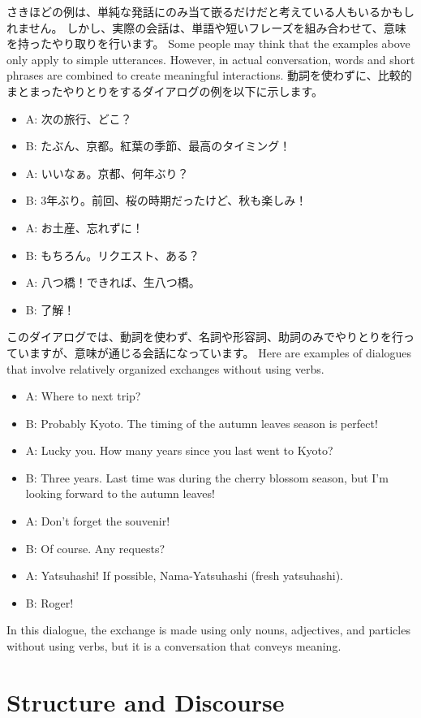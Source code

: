 \documentclass[uplatex,dvipdfmx,b5paper,english,10pt]{jsbook}
\begin{document}
\ifJapanese
  さきほどの例は、単純な発話にのみ当て嵌るだけだと考えている人もいるかもしれません。
  しかし、実際の会話は、単語や短いフレーズを組み合わせて、意味を持ったやり取りを行います。
\else
  Some people may think that the examples above only apply to simple utterances.
  However, in actual conversation, words and short phrases are combined to create meaningful interactions.
\fi
\ifJapanese
動詞を使わずに、比較的まとまったやりとりをするダイアログの例を以下に示します。
\begin{itemize}
  \item A: 次の旅行、どこ？
  \item B: たぶん、京都。紅葉の季節、最高のタイミング！
  \item A: いいなぁ。京都、何年ぶり？
  \item B: 3年ぶり。前回、桜の時期だったけど、秋も楽しみ！
  \item A: お土産、忘れずに！
  \item B: もちろん。リクエスト、ある？
  \item A: 八つ橋！できれば、生八つ橋。
  \item B: 了解！
\end{itemize}
このダイアログでは、動詞を使わず、名詞や形容詞、助詞のみでやりとりを行っていますが、意味が通じる会話になっています。
\else
Here are examples of dialogues that involve relatively organized exchanges without using verbs.
\begin{itemize}
  \item A: Where to next trip?
  \item B: Probably Kyoto. The timing of the autumn leaves season is perfect!
  \item A: Lucky you. How many years since you last went to Kyoto?
  \item B: Three years. Last time was during the cherry blossom season, but I'm looking forward to the autumn leaves!
  \item A: Don't forget the souvenir!
  \item B: Of course. Any requests?
  \item A: Yatsuhashi! If possible, Nama-Yatsuhashi (fresh yatsuhashi).
  \item B: Roger!
\end{itemize}
In this dialogue, the exchange is made using only nouns, adjectives, and particles without using verbs, but it is a conversation that conveys meaning.
\fi

\ifEnglish
\section{Structure and Discourse}
\else
\end{document}
